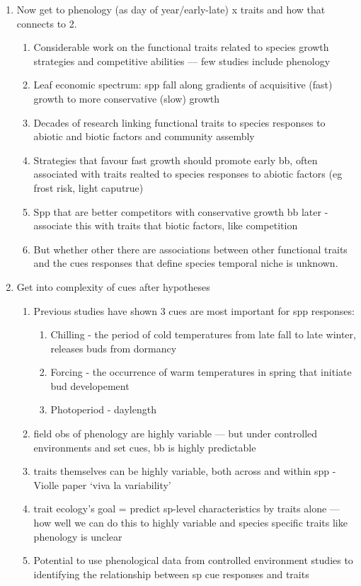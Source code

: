 \documentclass{article}
\begin{document}
\begin{enumerate}
\item Now get to phenology (as day of year/early-late) x traits and how that connects to 2.
\begin{enumerate}
\item Considerable work on the functional traits related to species growth strategies and competitive abilities — few studies include phenology
\item Leaf economic spectrum: spp fall along gradients of acquisitive (fast) growth to more conservative (slow) growth %
\item Decades of research linking functional traits to species responses to abiotic and biotic factors and community assembly
\item Strategies that favour fast growth should promote early bb, often associated with traits realted to species responses to abiotic factors (eg frost risk, light caputrue)
\item Spp that are better competitors with conservative growth bb later - associate this with traits that biotic factors, like competition
\item But whether other there are associations between other functional traits and the cues responses that define species temporal niche is unknown.
\end{enumerate}

\item Get into complexity of cues after hypotheses
\begin{enumerate}
\item Previous studies have shown 3 cues are most important for spp responses:
\begin{enumerate}
\item Chilling - the period of cold temperatures from late fall to late winter, releases buds from dormancy
\item Forcing - the occurrence of warm temperatures in spring that initiate bud developement 
\item Photoperiod - daylength
\end{enumerate}
\item field obs of phenology are highly variable — but under controlled environments and set cues, bb is highly predictable
\item traits themselves can be highly variable, both across and within spp - Violle paper ‘viva la variability’
\item trait ecology’s goal = predict sp-level characteristics by traits alone — how well we can do this to highly variable and species specific traits like phenology is unclear
\item Potential to use phenological data from controlled environment studies to identifying the relationship between sp cue responses and traits
\end{enumerate}


\end{enumerate}
\end{document}
